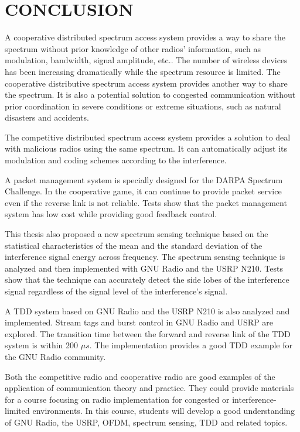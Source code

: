 %
%

\chapter{CONCLUSION}
\label{chap:conclusion}
A cooperative distributed spectrum access system provides a way to share the spectrum without prior knowledge of other radios' information, such as modulation, bandwidth, signal amplitude, etc.. The number of wireless devices has been increasing dramatically while the spectrum resource is limited. The cooperative distributive spectrum access system provides another way to share the spectrum. It is also a potential solution to congested communication without prior coordination in severe conditions or extreme situations, such as natural disasters and accidents.

The competitive distributed spectrum access system provides a solution to deal with malicious radios using the same spectrum. It can automatically adjust its modulation and coding schemes according to the interference.

A packet management system is specially designed for the DARPA Spectrum Challenge. In the cooperative game, it can continue to provide packet service even if the reverse link is not reliable. Tests show that the packet management system has low cost while providing good feedback control.

This thesis also proposed a new spectrum sensing technique based on the statistical characteristics of the mean and the standard deviation of the interference signal energy across frequency. The spectrum sensing technique is analyzed and then implemented with GNU Radio and the USRP N210. Tests show that the technique can accurately detect the side lobes of the interference signal regardless of the signal level of the interference's signal.

A TDD system based on GNU Radio and the USRP N210 is also analyzed and implemented. Stream tags and burst control in GNU Radio and USRP are explored. The transition time between the forward and reverse link of the TDD system is within 200 $\mu s$. The implementation provides a good TDD example for the GNU Radio community.

Both the competitive radio and cooperative radio are good examples of the application of communication theory and practice. They could provide materials for a course focusing on radio implementation for congested or interference-limited environments. In this course, students will develop a good understanding of GNU Radio, the USRP, OFDM, spectrum sensing, TDD and related topics.
